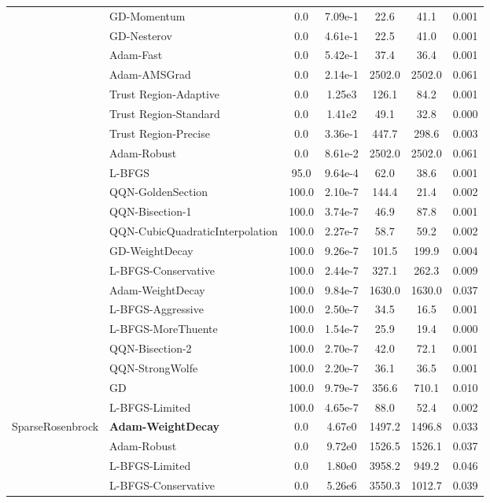 \documentclass{article}
\begin{document}
\begin{table}[htbp]
{\begin{tabular}{p{2.5cm}p{2.5cm}*{5}{c}}
 & GD-Momentum & 0.0 & 7.09e-1 & 22.6 & 41.1 & 0.001 \\
 & GD-Nesterov & 0.0 & 4.61e-1 & 22.5 & 41.0 & 0.001 \\
 & Adam-Fast & 0.0 & 5.42e-1 & 37.4 & 36.4 & 0.001 \\
 & Adam-AMSGrad & 0.0 & 2.14e-1 & 2502.0 & 2502.0 & 0.061 \\
 & Trust Region-Adaptive & 0.0 & 1.25e3 & 126.1 & 84.2 & 0.001 \\
 & Trust Region-Standard & 0.0 & 1.41e2 & 49.1 & 32.8 & 0.000 \\
 & Trust Region-Precise & 0.0 & 3.36e-1 & 447.7 & 298.6 & 0.003 \\
 & Adam-Robust & 0.0 & 8.61e-2 & 2502.0 & 2502.0 & 0.061 \\
 & L-BFGS & 95.0 & 9.64e-4 & 62.0 & 38.6 & 0.001 \\
 & QQN-GoldenSection & 100.0 & 2.10e-7 & 144.4 & 21.4 & 0.002 \\
 & QQN-Bisection-1 & 100.0 & 3.74e-7 & 46.9 & 87.8 & 0.001 \\
 & QQN-CubicQuadraticInterpolation & 100.0 & 2.27e-7 & 58.7 & 59.2 & 0.002 \\
 & GD-WeightDecay & 100.0 & 9.26e-7 & 101.5 & 199.9 & 0.004 \\
 & L-BFGS-Conservative & 100.0 & 2.44e-7 & 327.1 & 262.3 & 0.009 \\
 & Adam-WeightDecay & 100.0 & 9.84e-7 & 1630.0 & 1630.0 & 0.037 \\
 & L-BFGS-Aggressive & 100.0 & 2.50e-7 & 34.5 & 16.5 & 0.001 \\
 & L-BFGS-MoreThuente & 100.0 & 1.54e-7 & 25.9 & 19.4 & 0.000 \\
 & QQN-Bisection-2 & 100.0 & 2.70e-7 & 42.0 & 72.1 & 0.001 \\
 & QQN-StrongWolfe & 100.0 & 2.20e-7 & 36.1 & 36.5 & 0.001 \\
 & GD & 100.0 & 9.79e-7 & 356.6 & 710.1 & 0.010 \\
 & L-BFGS-Limited & 100.0 & 4.65e-7 & 88.0 & 52.4 & 0.002 \\
\midrule
\multirow{25}{*}{SparseRosenbrock} & \textbf{Adam-WeightDecay} & 0.0 & 4.67e0 & 1497.2 & 1496.8 & 0.033 \\
 & Adam-Robust & 0.0 & 9.72e0 & 1526.5 & 1526.1 & 0.037 \\
 & L-BFGS-Limited & 0.0 & 1.80e0 & 3958.2 & 949.2 & 0.046 \\
 & L-BFGS-Conservative & 0.0 & 5.26e6 & 3550.3 & 1012.7 & 0.039 \\

\end{tabular}}
\end{table}
\end{document}
